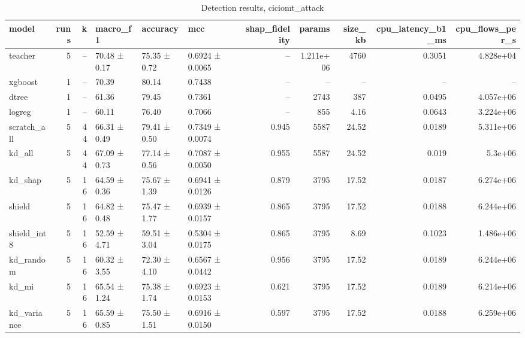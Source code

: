\begin{table}
\caption{Detection results, ciciomt_attack}
\begin{tabular}{lrrlllrrrrr}
\toprule
model & runs & k & macro_f1 & accuracy & mcc & shap_fidelity & params & size_kb & cpu_latency_b1_ms & cpu_flows_per_s \\
\midrule
teacher & 5 & -- & 70.48 ± 0.17 & 75.35 ± 0.72 & 0.6924 ± 0.0065 & -- & 1.211e+06 & 4760 & 0.3051 & 4.828e+04 \\
xgboost & 1 & -- & 70.39 & 80.14 & 0.7438 & -- & -- & -- & -- & -- \\
dtree & 1 & -- & 61.36 & 79.45 & 0.7361 & -- & 2743 & 387 & 0.0495 & 4.057e+06 \\
logreg & 1 & -- & 60.11 & 76.40 & 0.7066 & -- & 855 & 4.16 & 0.0643 & 3.224e+06 \\
scratch_all & 5 & 44 & 66.31 ± 0.49 & 79.41 ± 0.50 & 0.7349 ± 0.0074 & 0.945 & 5587 & 24.52 & 0.0189 & 5.311e+06 \\
kd_all & 5 & 44 & 67.09 ± 0.73 & 77.14 ± 0.56 & 0.7087 ± 0.0050 & 0.955 & 5587 & 24.52 & 0.019 & 5.3e+06 \\
kd_shap & 5 & 16 & 64.59 ± 0.36 & 75.67 ± 1.39 & 0.6941 ± 0.0126 & 0.879 & 3795 & 17.52 & 0.0187 & 6.274e+06 \\
shield & 5 & 16 & 64.82 ± 0.48 & 75.47 ± 1.77 & 0.6939 ± 0.0157 & 0.865 & 3795 & 17.52 & 0.0188 & 6.244e+06 \\
shield_int8 & 5 & 16 & 52.59 ± 4.71 & 59.51 ± 3.04 & 0.5304 ± 0.0175 & 0.865 & 3795 & 8.69 & 0.1023 & 1.486e+06 \\
kd_random & 5 & 16 & 60.32 ± 3.55 & 72.30 ± 4.10 & 0.6567 ± 0.0442 & 0.956 & 3795 & 17.52 & 0.0189 & 6.244e+06 \\
kd_mi & 5 & 16 & 65.54 ± 1.24 & 75.38 ± 1.74 & 0.6923 ± 0.0153 & 0.621 & 3795 & 17.52 & 0.0189 & 6.214e+06 \\
kd_variance & 5 & 16 & 65.59 ± 0.85 & 75.50 ± 1.51 & 0.6916 ± 0.0150 & 0.597 & 3795 & 17.52 & 0.0188 & 6.259e+06 \\
\bottomrule
\end{tabular}
\end{table}
